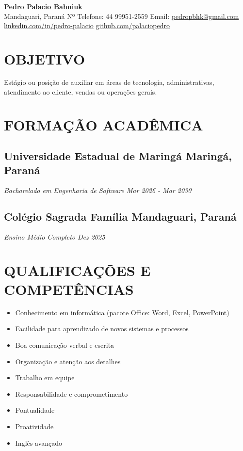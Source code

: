 \documentclass[a4paper,10pt]{article}
\begin{document}
\begin{center}
    {\LARGE \textbf{Pedro Palacio Bahniuk}} 
    \\ [0.1cm]
    Mandaguari, Paraná
    {\textbullet}
    Nº Telefone: {44 99951-2559} 
    {\textbullet}
    Email: \href{mailto:pedropbhk@gmail.com}{pedropbhk@gmail.com} 
    {\textbullet}
    \href{https://www.linkedin.com/in/pedro-palacio}{linkedin.com/in/pedro-palacio} 
    {\textbullet}
    \href{https://github.com/palaciopedro}{github.com/palaciopedro}
\end{center}



\section{OBJETIVO}
        Estágio ou posição de auxiliar em áreas de tecnologia, administrativas, atendimento ao cliente, vendas ou operações gerais.

\section{FORMAÇÃO ACADÊMICA}
    \subsection*{\texorpdfstring{
            \textbf{Universidade Estadual de Maringá} \hfill Maringá, Paraná
        }{
            Nome da Sua Universidade (Educação) -- Localização
        }}
    \textit{Bacharelado em Engenharia de Software \hfill Mar 2026 - Mar 2030 }
    
    \subsection*{\texorpdfstring{
            \textbf{Colégio Sagrada Família} \hfill Mandaguari, Paraná
        }{
            Nome da Sua Universidade (Educação) -- Localização
        }}
    \textit{Ensino Médio Completo \hfill Dez 2025 }

\section{QUALIFICAÇÕES E COMPETÊNCIAS}
    \begin{itemize}
        \item Conhecimento em informática (pacote Office: Word, Excel, PowerPoint)
        \item Facilidade para aprendizado de novos sistemas e processos
        \item Boa comunicação verbal e escrita
        \item Organização e atenção aos detalhes
        \item Trabalho em equipe
        \item Responsabilidade e comprometimento
        \item Pontualidade
        \item Proatividade
        \item Inglês avançado
    \end{itemize}
\end{document}
